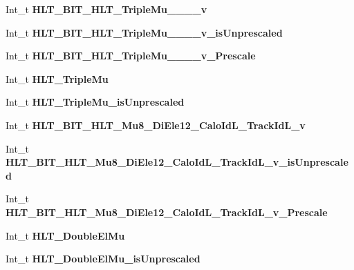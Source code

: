 \begin{DoxyCompactItemize}
Int\+\_\+t {\bfseries H\+L\+T\+\_\+\+B\+I\+T\+\_\+\+H\+L\+T\+\_\+\+Triple\+Mu\+\_\+\_\+\_\+\_\+v}
\item 
\hypertarget{classMiniTree_ac8c0b91440c9358e6c4727470ffdfa42}{}\label{classMiniTree_ac8c0b91440c9358e6c4727470ffdfa42} 
Int\+\_\+t {\bfseries H\+L\+T\+\_\+\+B\+I\+T\+\_\+\+H\+L\+T\+\_\+\+Triple\+Mu\+\_\+\_\+\_\+\_\+v\+\_\+is\+Unprescaled}
\item 
\hypertarget{classMiniTree_a28b7910578cb8605ea0f3dd8474011a1}{}\label{classMiniTree_a28b7910578cb8605ea0f3dd8474011a1} 
Int\+\_\+t {\bfseries H\+L\+T\+\_\+\+B\+I\+T\+\_\+\+H\+L\+T\+\_\+\+Triple\+Mu\+\_\+\_\+\_\+\_\+v\+\_\+\+Prescale}
\item 
\hypertarget{classMiniTree_aee4ef658202b6370711d51740ba427ae}{}\label{classMiniTree_aee4ef658202b6370711d51740ba427ae} 
Int\+\_\+t {\bfseries H\+L\+T\+\_\+\+Triple\+Mu}
\item 
\hypertarget{classMiniTree_a7c0da015c9313074f15da8452341b80a}{}\label{classMiniTree_a7c0da015c9313074f15da8452341b80a} 
Int\+\_\+t {\bfseries H\+L\+T\+\_\+\+Triple\+Mu\+\_\+is\+Unprescaled}
\item 
\hypertarget{classMiniTree_a1aa16b2990dceab0704821d1bf8abae6}{}\label{classMiniTree_a1aa16b2990dceab0704821d1bf8abae6} 
Int\+\_\+t {\bfseries H\+L\+T\+\_\+\+B\+I\+T\+\_\+\+H\+L\+T\+\_\+\+Mu8\+\_\+\+Di\+Ele12\+\_\+\+Calo\+Id\+L\+\_\+\+Track\+Id\+L\+\_\+v}
\item 
\hypertarget{classMiniTree_a95b3bf25b13597f05cb756f7c64d30cf}{}\label{classMiniTree_a95b3bf25b13597f05cb756f7c64d30cf} 
Int\+\_\+t {\bfseries H\+L\+T\+\_\+\+B\+I\+T\+\_\+\+H\+L\+T\+\_\+\+Mu8\+\_\+\+Di\+Ele12\+\_\+\+Calo\+Id\+L\+\_\+\+Track\+Id\+L\+\_\+v\+\_\+is\+Unprescaled}
\item 
\hypertarget{classMiniTree_aad86830f032d2573073eb35c6a886bf4}{}\label{classMiniTree_aad86830f032d2573073eb35c6a886bf4} 
Int\+\_\+t {\bfseries H\+L\+T\+\_\+\+B\+I\+T\+\_\+\+H\+L\+T\+\_\+\+Mu8\+\_\+\+Di\+Ele12\+\_\+\+Calo\+Id\+L\+\_\+\+Track\+Id\+L\+\_\+v\+\_\+\+Prescale}
\item 
\hypertarget{classMiniTree_a40c25848b99e6ac15e9713eaeed3f225}{}\label{classMiniTree_a40c25848b99e6ac15e9713eaeed3f225} 
Int\+\_\+t {\bfseries H\+L\+T\+\_\+\+Double\+El\+Mu}
\item 
\hypertarget{classMiniTree_a0cb99f9d02ed9e888172a3e51f705d92}{}\label{classMiniTree_a0cb99f9d02ed9e888172a3e51f705d92} 
Int\+\_\+t {\bfseries H\+L\+T\+\_\+\+Double\+El\+Mu\+\_\+is\+Unprescaled}
\item 
\hypertarget{classMiniTree_ae092e4e525e1c99ab0ef51fd014fbd33}{}\label{classMiniTree_ae092e4e525e1c99ab0ef51fd014fbd33} 

\end{DoxyCompactItemize}
